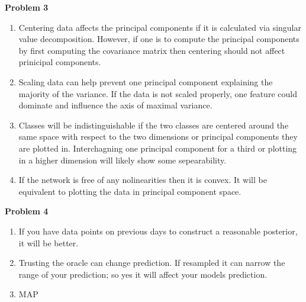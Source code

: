 \documentclass[11pt,letterpaper]{article}
\begin{document}
\textbf{Problem 3}
\begin{enumerate}[labelindent=0pt]
\item 
Centering data affects the principal components if it is calculated via singular
value decomposition.  However, if one is to compute the principal components by
first computing the covariance matrix then centering should not affect
prinicipal components.

\item 
Scaling data can help prevent one principal component explaining the majority of
the variance.  If the data is not scaled properly, one feature could dominate
and influence the axis of maximal variance. 

\item 
Classes will be indistinguishable if the two classes are centered around the
same space with respect to the two dimensions or principal components they are
plotted in.  Interchagning one principal component for a third or plotting in a
higher dimension will likely show some sepearability.

\item 
If the network is free of any nolinearities then it is convex.  
It will be equivalent to plotting the data in principal component space.
\end{enumerate}

\textbf{Problem 4}
\begin{enumerate}[labelindent=0pt]
\item 
If you have data points on previous days to construct a reasonable posterior, it will be better. 
\item 
Trusting the oracle can change prediction. If resampled it can narrow the range
of your prediction; so yes it will affect your models prediction.
\item 
MAP
\end{enumerate}


\noindent
\end{document}
